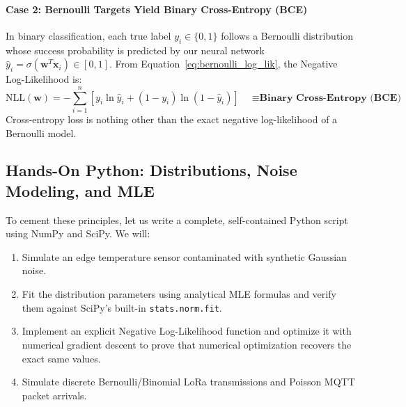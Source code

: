 \paragraph{Case 2: Bernoulli Targets Yield Binary Cross-Entropy (BCE)}
In binary classification, each true label $y_i \in \{0, 1\}$ follows a Bernoulli distribution whose success probability is predicted by our neural network $\hat{y}_i = \sigma(\mathbf{w}^T \mathbf{x}_i) \in [0, 1]$.
From Equation~\eqref{eq:bernoulli_log_lik}, the Negative Log-Likelihood is:
\begin{equation}
\text{NLL}(\mathbf{w}) = -\sum_{i=1}^{n} \left[ y_i \ln \hat{y}_i + (1 - y_i) \ln(1 - \hat{y}_i) \right] \quad \mathbf{\equiv \text{Binary Cross-Entropy (BCE)}}
\end{equation}
Cross-entropy loss is nothing other than the exact negative log-likelihood of a Bernoulli model.

\subsection{Hands-On Python: Distributions, Noise Modeling, and MLE}\label{subsec:prob_python}

To cement these principles, let us write a complete, self-contained Python script using NumPy and SciPy. We will:
\begin{enumerate}
    \item Simulate an edge temperature sensor contaminated with synthetic Gaussian noise.
    \item Fit the distribution parameters using analytical MLE formulas and verify them against SciPy's built-in \texttt{stats.norm.fit}.
    \item Implement an explicit Negative Log-Likelihood function and optimize it with numerical gradient descent to prove that numerical optimization recovers the exact same values.
    \item Simulate discrete Bernoulli/Binomial LoRa transmissions and Poisson MQTT packet arrivals.
\end{enumerate}

